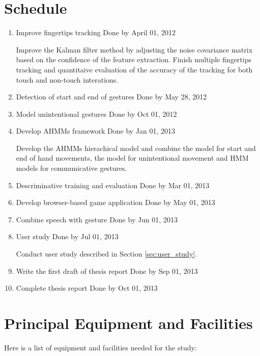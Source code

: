 \section{Schedule}
\begin{enumerate}
  \item Improve fingertips tracking \hfill Done by April 01, 2012

  Improve the Kalman filter method by adjusting the noise covariance matrix
  based on the confidence of the feature extraction. Finish multiple fingertips
  tracking and quantitaive evaluation of the accuracy of the tracking for both
  touch and non-touch interations.

  \item Detection of start and end of gestures \hfill Done by May 28, 2012

  \item Model unintentional gestures \hfill Done by Oct 01, 2012

  \item Develop AHMMs framework	\hfill Done by Jan 01, 2013

  Develop the AHMMs hierachical model and combine the model for start and
  end of hand movements, the model for unintentional movement and HMM models for
  communicative gestures. 
  
  \item Descriminative training and evaluation \hfill Done by Mar 01, 2013
  
  \item Develop browser-based game application \hfill Done by May 01, 2013
    
  \item Combine speech with gesture	\hfill Done by Jun 01, 2013

  \item User study \hfill Done by Jul 01, 2013

  Conduct user study described in Section \ref{sec:user_study}.
  
  \item Write the first draft of thesis report \hfill Done by Sep 01, 2013
  \item Complete thesis report	\hfill Done by Oct 01, 2013
  \end{enumerate}

\section{Principal Equipment and Facilities}
Here is a list of equipment and facilities needed for the study:

